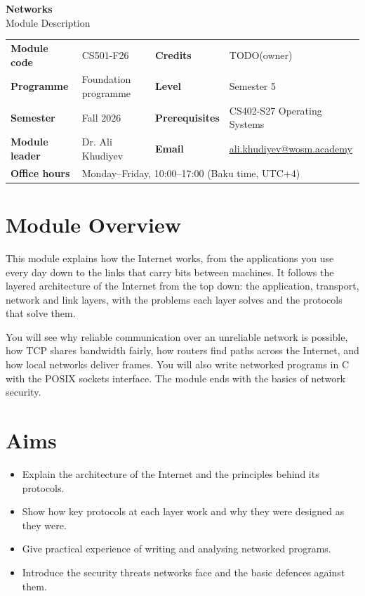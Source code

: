 \documentclass[11pt,a4paper]{article}
\makeatletter
\newcommand{\ModuleTitle}{Networks}
\newcommand{\ModuleCode}{CS501-F26}
\newcommand{\Programme}{Foundation programme}
\newcommand{\Level}{Semester 5}
\newcommand{\Semester}{Fall 2026}
\newcommand{\Credits}{TODO(owner)}
\newcommand{\ModuleLeader}{Dr. Ali Khudiyev}
\newcommand{\Email}{ali.khudiyev@wosm.academy}
\newcommand{\OfficeHours}{Monday--Friday, 10:00--17:00 (Baku time, UTC+4)}
\newcommand{\Prerequisites}{CS402-S27 Operating Systems}
\makeatother
\begin{document}
\begin{center}
  {\LARGE\bfseries\color{accent} \ModuleTitle}\\[4pt]
  {\large Module Description}
\end{center}
\vspace{6pt}

\begin{tabularx}{\textwidth}{>{\bfseries}l X >{\bfseries}l X}
\toprule
Module code   & \ModuleCode    & Credits      & \Credits \\
Programme     & \Programme     & Level        & \Level \\
Semester      & \Semester      & Prerequisites & \Prerequisites \\
Module leader & \ModuleLeader  & Email        & \href{mailto:\Email}{\Email} \\
Office hours  & \multicolumn{3}{l}{\OfficeHours} \\
\bottomrule
\end{tabularx}

\section{Module Overview}
This module explains how the Internet works, from the applications you use every day
down to the links that carry bits between machines. It follows the layered
architecture of the Internet from the top down: the application, transport, network
and link layers, with the problems each layer solves and the protocols that solve
them.

You will see why reliable communication over an unreliable network is possible, how
TCP shares bandwidth fairly, how routers find paths across the Internet, and how
local networks deliver frames. You will also write networked programs in C with the
POSIX sockets interface.
The module ends with the basics of network security.

\section{Aims}
\begin{itemize}
  \item Explain the architecture of the Internet and the principles behind its protocols.
  \item Show how key protocols at each layer work and why they were designed as they were.
  \item Give practical experience of writing and analysing networked programs.
  \item Introduce the security threats networks face and the basic defences against them.
\end{itemize}
\end{document}
